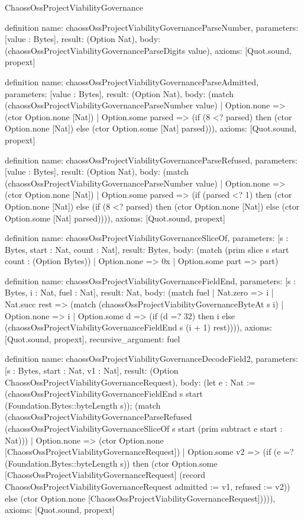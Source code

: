 \begin{lexlean}{ChaossOssProjectViabilityGovernance}
\begin{semanticmodule}
definition{
  name: chaossOssProjectViabilityGovernanceParseNumber,
  parameters: [value : Bytes],
  result: (Option Nat),
  body: (chaossOssProjectViabilityGovernanceParseDigits value),
  axioms: [Quot.sound, propext]
}

definition{
  name: chaossOssProjectViabilityGovernanceParseAdmitted,
  parameters: [value : Bytes],
  result: (Option Nat),
  body: (match (chaossOssProjectViabilityGovernanceParseNumber value)
    | Option.none => (ctor Option.none [Nat])
    | Option.some parsed => (if (8 <? parsed) then (ctor Option.none [Nat]) else (ctor Option.some [Nat] parsed))),
  axioms: [Quot.sound, propext]
}

definition{
  name: chaossOssProjectViabilityGovernanceParseRefused,
  parameters: [value : Bytes],
  result: (Option Nat),
  body: (match (chaossOssProjectViabilityGovernanceParseNumber value)
    | Option.none => (ctor Option.none [Nat])
    | Option.some parsed => (if (parsed <? 1) then (ctor Option.none [Nat]) else (if (8 <? parsed) then (ctor Option.none [Nat]) else (ctor Option.some [Nat] parsed)))),
  axioms: [Quot.sound, propext]
}

definition{
  name: chaossOssProjectViabilityGovernanceSliceOf,
  parameters: [s : Bytes, start : Nat, count : Nat],
  result: Bytes,
  body: (match (prim slice s start count : (Option Bytes))
    | Option.none => 0x
    | Option.some part => part)
}

definition{
  name: chaossOssProjectViabilityGovernanceFieldEnd,
  parameters: [s : Bytes, i : Nat, fuel : Nat],
  result: Nat,
  body: (match fuel
    | Nat.zero => i
    | Nat.succ rest => (match (chaossOssProjectViabilityGovernanceByteAt s i)
      | Option.none => i
      | Option.some d => (if (d =? 32) then i else (chaossOssProjectViabilityGovernanceFieldEnd s (i + 1) rest)))),
  axioms: [Quot.sound, propext],
  recursive_argument: fuel
}

definition{
  name: chaossOssProjectViabilityGovernanceDecodeField2,
  parameters: [s : Bytes, start : Nat, v1 : Nat],
  result: (Option ChaossOssProjectViabilityGovernanceRequest),
  body: (let e : Nat := (chaossOssProjectViabilityGovernanceFieldEnd s start (Foundation.Bytes::byteLength s)); (match (chaossOssProjectViabilityGovernanceParseRefused (chaossOssProjectViabilityGovernanceSliceOf s start (prim subtract e start : Nat)))
    | Option.none => (ctor Option.none [ChaossOssProjectViabilityGovernanceRequest])
    | Option.some v2 => (if (e =? (Foundation.Bytes::byteLength s)) then (ctor Option.some [ChaossOssProjectViabilityGovernanceRequest] (record ChaossOssProjectViabilityGovernanceRequest {admitted := v1, refused := v2})) else (ctor Option.none [ChaossOssProjectViabilityGovernanceRequest])))),
  axioms: [Quot.sound, propext]
}


\end{semanticmodule}
\end{lexlean}
